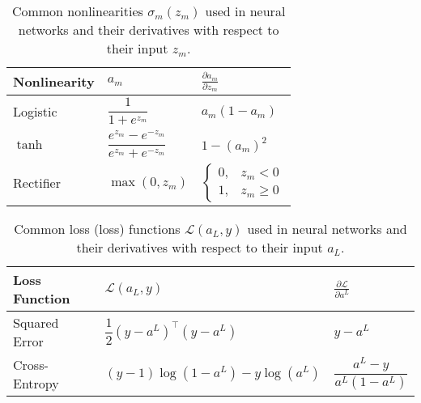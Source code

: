 \begin{table}
\begin{center}
\begin{tabular}{lll}
  \toprule
  Nonlinearity & $a_m$                                            & $\frac{\partial a_m}{\partial z_m}$                   \\
  \midrule
  Logistic     & $\dfrac{1}{1 + e^{z_m}}$                         & $a_m(1 - a_m)$                                        \\[1.2ex]
  $\tanh$      & $\dfrac{e^{z_m} - e^{-z_m}}{e^{z_m} + e^{-z_m}}$ & $1 - (a_m)^2$                                         \\[1.2ex]
  Rectifier    & $\max(0, z_m)$                                   & $\begin{cases}0,& z_m < 0\\ 1,& z_m \ge 0\end{cases}$ \\
  \bottomrule
\end{tabular}
\end{center}
\caption[Common nonlinearities used in neural networks]{Common nonlinearities $\sigma_m(z_m)$ used in neural networks and their derivatives with respect to their input $z_m$.}
  \label{tab:nonlinearities}
\end{table}

\begin{table}
\begin{center}
\begin{tabular}{lll}
  \toprule
  Loss Function & $\mathcal{L}(a_L, y)$                           & $\frac{\partial \mathcal{L}}{\partial a^L}$ \\
  \midrule
  Squared Error & $\dfrac{1}{2}(y - a^L)^\top(y - a^L)$ & $y - a^L$                         \\
  Cross-Entropy & $(y - 1)\log(1 - a^L) - y\log(a^L)$   & $\dfrac{a^L - y}{a^L(1 - a^L)}$   \\
  \bottomrule
\end{tabular}
\end{center}
\caption[Common loss functions used in neural networks]{Common loss (loss) functions $\mathcal{L}(a_L, y)$ used in neural networks and their derivatives with respect to their input $a_L$.}
  \label{tab:loss_functions}
\end{table}

